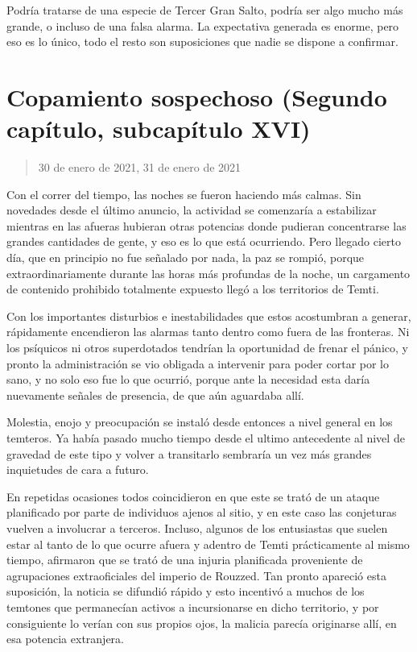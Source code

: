 \documentclass[
  spanish,
]{book}
\begin{document}
Podría tratarse de una especie de Tercer Gran Salto, podría ser algo mucho más grande, o incluso de una falsa alarma. La expectativa generada es enorme, pero eso es lo único, todo el resto son suposiciones que nadie se dispone a confirmar.

\hypertarget{copamiento-sospechoso-segundo-capuxedtulo-subcapuxedtulo-xvi}{%
\section{Copamiento sospechoso (Segundo capítulo, subcapítulo XVI)}\label{copamiento-sospechoso-segundo-capuxedtulo-subcapuxedtulo-xvi}}

\begin{quote}
30 de enero de 2021, 31 de enero de 2021
\end{quote}

Con el correr del tiempo, las noches se fueron haciendo más calmas. Sin novedades desde el último anuncio, la actividad se comenzaría a estabilizar mientras en las afueras hubieran otras potencias donde pudieran concentrarse las grandes cantidades de gente, y eso es lo que está ocurriendo. Pero llegado cierto día, que en principio no fue señalado por nada, la paz se rompió, porque extraordinariamente durante las horas más profundas de la noche, un cargamento de contenido prohibido totalmente expuesto llegó a los territorios de Temti.

Con los importantes disturbios e inestabilidades que estos acostumbran a generar, rápidamente encendieron las alarmas tanto dentro como fuera de las fronteras. Ni los psíquicos ni otros superdotados tendrían la oportunidad de frenar el pánico, y pronto la administración se vio obligada a intervenir para poder cortar por lo sano, y no solo eso fue lo que ocurrió, porque ante la necesidad esta daría nuevamente señales de presencia, de que aún aguardaba allí.

Molestia, enojo y preocupación se instaló desde entonces a nivel general en los temteros. Ya había pasado mucho tiempo desde el ultimo antecedente al nivel de gravedad de este tipo y volver a transitarlo sembraría un vez más grandes inquietudes de cara a futuro.

En repetidas ocasiones todos coincidieron en que este se trató de un ataque planificado por parte de individuos ajenos al sitio, y en este caso las conjeturas vuelven a involucrar a terceros. Incluso, algunos de los entusiastas que suelen estar al tanto de lo que ocurre afuera y adentro de Temti prácticamente al mismo tiempo, afirmaron que se trató de una injuria planificada proveniente de agrupaciones extraoficiales del imperio de Rouzzed. Tan pronto apareció esta suposición, la noticia se difundió rápido y esto incentivó a muchos de los temtones que permanecían activos a incursionarse en dicho territorio, y por consiguiente lo verían con sus propios ojos, la malicia parecía originarse allí, en esa potencia extranjera.
\end{document}
